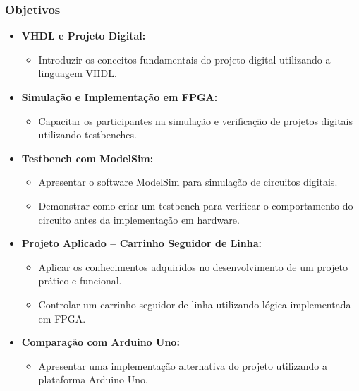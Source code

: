 \documentclass[aspectratio=169]{beamer}
\begin{document}
\begin{frame}
	\frametitle{Objetivos}
	
	\begin{itemize}
		\item \textbf{VHDL e Projeto Digital:}
		\begin{itemize}
			\item Introduzir os conceitos fundamentais do projeto digital utilizando a linguagem VHDL.
		\end{itemize}
		
		\item \textbf{Simulação e Implementação em FPGA:}
		\begin{itemize}
			\item Capacitar os participantes na simulação e verificação de projetos digitais utilizando testbenches.
		\end{itemize}
		
		\item \textbf{Testbench com ModelSim:}
		\begin{itemize}
			\item Apresentar o software ModelSim para simulação de circuitos digitais.
			\item Demonstrar como criar um testbench para verificar o comportamento do circuito antes da implementação em hardware.
		\end{itemize}		
		
		
		\item \textbf{Projeto Aplicado – Carrinho Seguidor de Linha:}
		\begin{itemize}
			\item Aplicar os conhecimentos adquiridos no desenvolvimento de um projeto prático e funcional.
			\item Controlar um carrinho seguidor de linha utilizando lógica implementada em FPGA.
		\end{itemize}
		

		
		\item \textbf{Comparação com Arduino Uno:}
		\begin{itemize}
			\item Apresentar uma implementação alternativa do projeto utilizando a plataforma Arduino Uno.
		\end{itemize}
	\end{itemize}


\end{frame}
\end{document}
